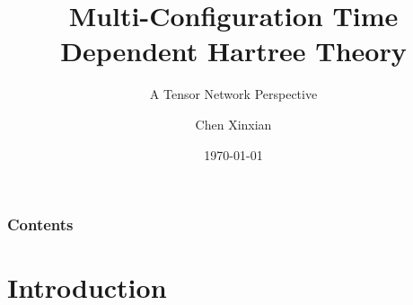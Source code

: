 \documentclass[12pt]{beamer}
\begin{document}
    \title{Multi-Configuration Time Dependent Hartree Theory}
    \subtitle{A Tensor Network Perspective}
    \author{Chen Xinxian}
    \date{\today}

    \frame{\titlepage}

    \begin{frame}
        \frametitle{Contents}
        \tableofcontents
    \end{frame}

\section{Introduction}
\end{document}
